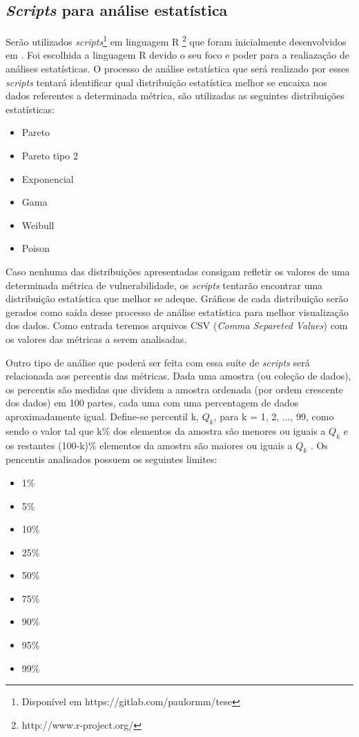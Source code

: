 \subsection{\textit{Scripts} para análise estatística} \label{scripts}

Serão utilizados \textit{scripts}\footnote{Disponível em https://gitlab.com/paulormm/tese} em linguagem R
\footnote{http://www.r-project.org/} que foram inicialmente desenvolvidos em \cite{meirelles2013}. Foi escolhida a linguagem R
devido o seu foco e poder para a realiazação de análises estatísticas. O processo de análise estatística que será realizado
por esses \textit{scripts} tentará identificar qual distribuição estatística melhor se encaixa nos dados referentes a 
determinada métrica, são utilizadas as seguintes distribuições estatísticas:

\begin{itemize}
  \item Pareto
  \item Pareto tipo 2
  \item Exponencial
  \item Gama
  \item Weibull
  \item Poison
\end{itemize}

Caso nenhuma das distribuições apresentadas consigam refletir os valores de uma determinada métrica de vulnerabilidade, os
\textit{scripts} tentarão encontrar uma distribuição estatística que melhor se adeque. Gráficos de cada distribuição serão
gerados como saída desse processo de análise estatística para melhor visualização dos dados. Como entrada teremos arquivos
CSV (\textit{Comma Separeted Values}) com os valores das métricas a serem analisadas.

Outro tipo de análise que poderá ser feita com essa suíte de \textit{scripts} será relacionada aos percentis das métricas.
Dada uma amostra (ou coleção de dados), os percentis são medidas que dividem a amostra ordenada (por ordem crescente dos dados) 
em 100 partes, cada uma com uma percentagem de dados aproximadamente igual. Define-se percentil k, ${Q_k}$, 
para k = 1, 2, ..., 99, como sendo o valor tal que k\% dos elementos da amostra são menores ou iguais a ${Q_k}$ e os restantes 
(100-k)\% elementos da amostra são maiores ou iguais a ${Q_k}$ \cite{martins2013}. Os pencentis analisados possuem os seguintes
limites:

\begin{itemize}
  \item 1\%
  \item 5\%
  \item 10\%
  \item 25\%
  \item 50\%
  \item 75\%
  \item 90\%
  \item 95\%
  \item 99\%
\end{itemize}

